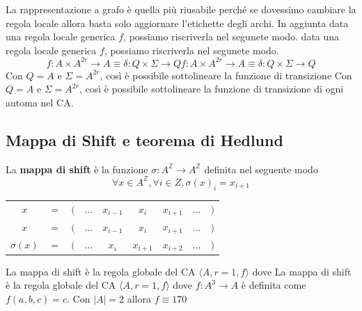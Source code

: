 La rappresentazione a grafo è quella più riusabile perché se dovessimo cambiare
la regola locale allora basta solo aggiornare l'etichette degli archi. In aggiunta
data una regola locale generica $f$, possiamo riscriverla nel segunete modo.
data una regola locale generica $f$, possiamo riscriverla nel segunete modo.
\begin{equation}
    f: A\times A^{2r} \rightarrow A \equiv \delta: Q\times \Sigma \rightarrow Q
    f: A\times A^{2r} \rightarrow A \equiv \delta: Q\times \Sigma \rightarrow Q
\end{equation}
Con $Q= A$ e $\Sigma = A^{2r} $, così è possibile sottolineare la funzione di transizione
Con $Q= A$ e $\Sigma = A^{2r} $, così è possibile sottolineare la funzione di transizione
di ogni automa nel CA.
\subsection{ Mappa di Shift e teorema di Hedlund}
\begin{definizione} 
    La \textbf{mappa di shift} è la funzione $\sigma:A^\mathbb{Z}\rightarrow A^\mathbb{Z}$
    definita nel seguente modo
    $$\forall x\in A^\mathbb{Z}, \forall i \in Z, \sigma(x)_i=x_{i+1}$$
    \begin{table}[!h]
        \centering
        \begin{tabular}{ccccccccc}
            $x$         & $=$ & $($ & $\dots$ & $x_{i-1}$ & $x_i$     & $x_{i+1}$ & $\dots$ & $)$ \\
            $x$         & $=$ & $($ & $\dots$ & $x_{i-1}$ & $x_i$     & $x_{i+1}$ & $\dots$ & $)$ \\
            $\sigma(x)$ & $=$ & $($ & $\dots$ & $x_{i}$   & $x_{i+1}$ & $x_{i+2}$ & $\dots$ & $)$
        \end{tabular}
    \end{table}
\end{definizione}

\begin{nota}
    La mappa di shift è la regola globale del CA $\langle A,r=1,f\rangle$ dove
    La mappa di shift è la regola globale del CA $\langle A,r=1,f\rangle$ dove
    $f:A^3\rightarrow A$ è definita come $f(a,b,c) = c$. Con $|A|=2$ allora $f\equiv 170$

\end{nota}


